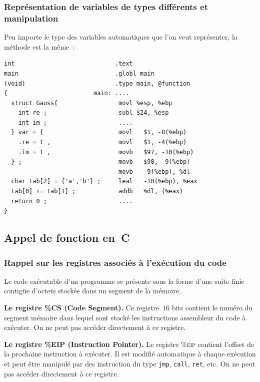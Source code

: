 \begin{frame}[fragile]
  \frametitle{Repr\'esentation de variables de types diff\'erents et manipulation}%
        Peu importe le type des variables automatiques que l'on veut repr\'esenter,
        la m\'ethode est la m\^eme~:
        \par\medskip
\begin{verbatim}
int                            .text                           
main                           .globl main                    
(void)                         .type main, @function    
{                        main: ....                      
  struct Gauss{                 movl %esp, %ebp         
    int re ;                    subl $24, %esp          
    int im ;                    ....                    
  } var = {                     movl   $1, -8(%ebp)       
    .re = 1 ,                   movl   $1, -4(%ebp)       
    .im = 1 ,                   movb   $97, -10(%ebp) 
  } ;                           movb   $98, -9(%ebp)  
                                movb   -9(%ebp), %dl  
  char tab[2] = {'a','b'} ;     leal   -10(%ebp), %eax
  tab[0] += tab[1] ;            addb   %dl, (%eax)    
  return 0 ;                    ....                    
}                                    
\end{verbatim}
\end{frame}
\begin{frame}
  \section{Appel de fonction en~C}
  \frametitle{Rappel sur les registres associ\'es \`a l'ex\'ecution du code}%

        Le code ex\'ecutable d'un programme se pr\'esente sous la forme 
        d'une suite finie contig\"ue d'octets stock\'ee dans un segment 
        de la m\'emoire.
        \par\medskip
        \textbf{Le registre \%\textsc{CS} (Code Segment).} Ce registre~$16$
        bits contient le num\'ero du segment m\'emoire dans lequel
        sont stock\'e les instructions assembleur du code \`a
        ex\'ecuter.  On ne peut pas acc\'eder directement \`a ce
        registre.
        \par\medskip
        \textbf{Le registre \%EIP (Instruction Pointer).}  Le
        registre \%\textsc{eip} contient l'offset de la prochaine
        instruction \`a ex\'ecuter.  Il est modifi\'e automatique \`a
        chaque ex\'ecution et peut \^etre manipul\'e par des
        instruction du type \texttt{jmp}, \texttt{call}, \texttt{ret},
        etc. On ne peut pas acc\'eder directement \`a ce registre.
\end{frame}
